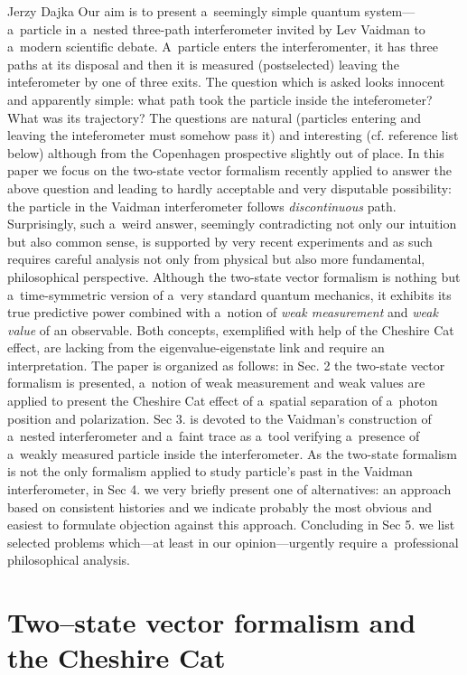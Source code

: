 \begin{artengenv}{Jerzy Dajka}
Our aim is to present a~seemingly simple quantum system---a~particle in a~nested three-path interferometer invited by Lev Vaidman to a~modern scientific debate. A~particle enters the interferomenter, it has three paths at its disposal and then it is measured (postselected) leaving the inteferometer by one of three exits. The question which is asked looks innocent and apparently simple: what path took the particle inside the inteferometer? What was its trajectory? The questions are natural (particles entering and leaving the inteferometer must somehow pass it) and interesting (cf. reference list below) although  from the Copenhagen prospective slightly out of place.  In this paper we focus on  the two-state vector formalism recently applied to answer the above question and leading to hardly acceptable and very disputable possibility: the particle in the Vaidman interferometer follows {\it discontinuous}  path. Surprisingly, such a~weird answer, seemingly contradicting not only our intuition but also common sense,  is supported by very recent experiments and as such requires careful analysis not only from physical but also more fundamental, philosophical perspective. Although the two-state vector formalism is nothing but a~time-symmetric version of a~very standard quantum mechanics, it exhibits its true predictive power combined with a~notion of {\it weak measurement} and {\it weak value} of an observable. Both concepts, exemplified with help of the Cheshire Cat effect, are lacking from the eigenvalue-eigenstate link and require an interpretation.  The paper is organized as follows: in Sec. 2 the two-state vector formalism is presented, a~notion of weak measurement and weak values are applied to present the Cheshire Cat effect of a~spatial separation of a~photon position and polarization. Sec 3. is devoted to the Vaidman's construction of a~nested  interferometer and a~faint trace  as a~tool verifying a~presence of a~weakly measured particle inside the interferometer. As  the two-state formalism is not the only formalism applied to study particle's past in the Vaidman interferometer,    in Sec 4. we very briefly present one of  alternatives: an approach based on consistent histories and we indicate probably the  most obvious and easiest to formulate objection against this approach. Concluding in Sec 5. we list selected problems which---at least in our opinion---urgently require a~professional philosophical analysis. 

\section{Two--state vector formalism and the Cheshire Cat}


\end{artengenv}
